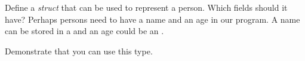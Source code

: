 Define a \textsl{struct} that can be used to represent a person. Which fields should it have? Perhaps persons need to have a name and an age in our program. A name can be stored in a  and an age could be an .

Demonstrate that you can use this type.
